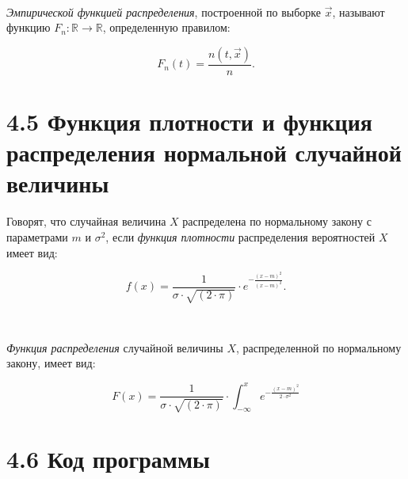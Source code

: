 \documentclass[12pt]{report}
\begin{document}
~\

\textit{Эмпирической функцией распределения}, построенной по выборке $\vec{x}$, называют функцию $F_n: \mathbb{R} \to \mathbb{R}$, определенную правилом: 

\begin{equation*}
	F_n(t) = \frac{n(t, \vec x)}{n}.
\end{equation*}

\section*{4.5 Функция плотности и функция распределения нормальной случайной величины}

Говорят, что случайная величина $X$ распределена по нормальному закону с параметрами $m$ и $\sigma^2$, если \textit{функция плотности} распределения вероятностей $X$ имеет вид:

\begin{equation*}
	f(x) = \frac{1}{\sigma \cdot \sqrt{(2 \cdot \pi)}} \cdot e^{-\frac{(x - m)^2}{(x - m)^2}}.
\end{equation*}

~\

\textit{Функция распределения} случайной величины $X$, распределенной по нормальному закону, имеет вид:

\begin{equation*}
	F(x) = \frac{1}{\sigma \cdot \sqrt{(2 \cdot \pi)}} \cdot \int_{-\infty}^{x}e^{-\frac{(x - m)^2}{2\cdot\sigma^2}}
\end{equation*}

\clearpage

\section*{4.6 Код программы}
\end{document}
